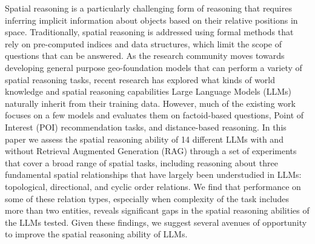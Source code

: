 
Spatial reasoning is a particularly challenging form of reasoning that requires inferring implicit information about objects based on their relative positions in space.
Traditionally, spatial reasoning is addressed using formal methods that rely on pre-computed indices and data structures, which limit the scope of questions that can be answered.
As the research community moves towards developing general purpose geo-foundation models that can perform a variety of spatial reasoning tasks, recent research has explored what kinds of world knowledge and spatial reasoning capabilities Large Language Models (LLMs) naturally inherit from their training data.
However, much of the existing work focuses on a few models and evaluates them on factoid-based questions, Point of Interest (POI) recommendation tasks, and distance-based reasoning.
In this paper we assess the spatial reasoning ability of 14 different LLMs with and without Retrieval Augmented Generation (RAG) through a set of experiments that cover a broad range of spatial tasks, including reasoning about three fundamental spatial relationships that have largely been understudied in LLMs: topological, directional, and cyclic order relations.
We find that performance on some of these relation types, especially when complexity of the task includes more than two entities, reveals significant gaps in the spatial reasoning abilities of the LLMs tested.
Given these findings, we suggest several avenues of opportunity to improve the spatial reasoning ability of LLMs.

